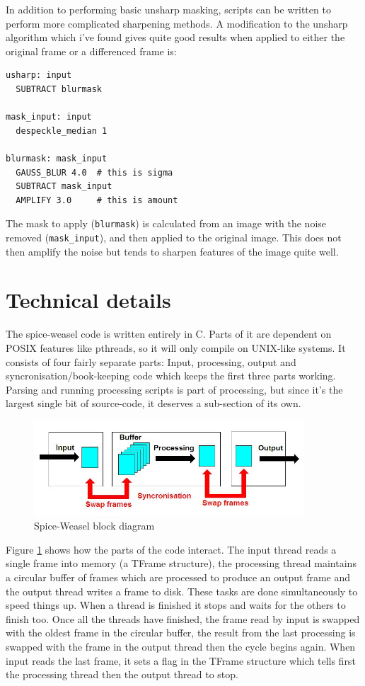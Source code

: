 \documentclass[12pt, a4paper]{article}
\begin{document}
In addition to performing basic unsharp masking, scripts can be written to perform
more complicated sharpening methods. A modification to the unsharp algorithm which
i've found gives quite good results when applied to either the original frame
or a differenced frame is:

\begin{verbatim}
usharp: input
  SUBTRACT blurmask

mask_input: input
  despeckle_median 1

blurmask: mask_input
  GAUSS_BLUR 4.0  # this is sigma
  SUBTRACT mask_input
  AMPLIFY 3.0     # this is amount
\end{verbatim}

The mask to apply (\texttt{blurmask}) is calculated from an image with the
noise removed (\texttt{mask\_input}), and then applied to the original image. 
This does not then amplify the noise but tends to sharpen features of the
image quite well.

\section{Technical details}

The spice-weasel code is written entirely in C. Parts of it are dependent on
POSIX features like pthreads, so it will only compile on UNIX-like systems.
It consists of four fairly separate parts: Input, processing, output and
syncronisation/book-keeping code which keeps the first three parts working. Parsing and running 
processing scripts is part of processing, but since it's the largest single bit
of source-code, it deserves a sub-section of its own.

\begin{figure}[ht]
\centering
\includegraphics[width=0.9\textwidth]{blockdiagram.jpg}
\caption{Spice-Weasel block diagram}
\label{figblock}
\end{figure}

Figure \ref{figblock} shows how the parts of the code interact. The input thread
reads a single frame into memory (a TFrame structure), the processing thread maintains
a circular buffer of frames which are processed to produce an output frame and the output
thread writes a frame to disk. These tasks are done simultaneously to speed things up.
When a thread is finished it stops and waits for the others to finish too. Once all the 
threads have finished, the frame read by input is swapped with the oldest frame
in the circular buffer, the result from the last processing is swapped with
the frame in the output thread then the cycle begins again. When input reads the last
frame, it sets a flag in the TFrame structure which tells first the processing thread
then the output thread to stop.
\end{document}

